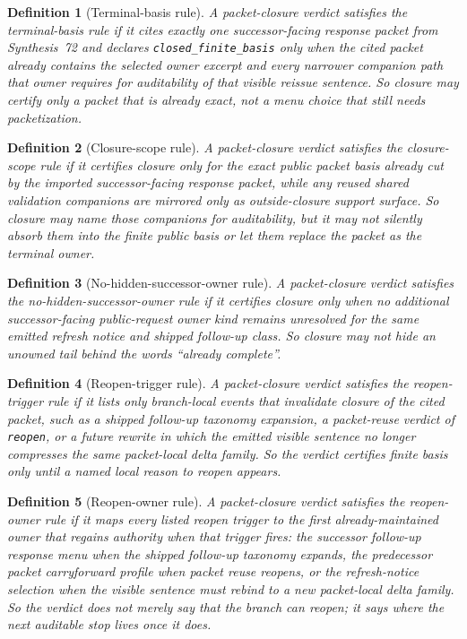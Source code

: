 \documentclass[11pt]{article}
\newtheorem{definition}{Definition}
\begin{document}
\begin{definition}[Terminal-basis rule]
A packet-closure verdict satisfies the \emph{terminal-basis rule} if it cites exactly one successor-facing response packet from Synthesis~72 and declares \texttt{closed\_finite\_basis} only when the cited packet already contains the selected owner excerpt and every narrower companion path that owner requires for auditability of that visible reissue sentence.
So closure may certify only a packet that is already exact, not a menu choice that still needs packetization.
\end{definition}

\begin{definition}[Closure-scope rule]
A packet-closure verdict satisfies the \emph{closure-scope rule} if it certifies closure only for the exact public packet basis already cut by the imported successor-facing response packet, while any reused shared validation companions are mirrored only as outside-closure support surface. So closure may name those companions for auditability, but it may not silently absorb them into the finite public basis or let them replace the packet as the terminal owner.
\end{definition}

\begin{definition}[No-hidden-successor-owner rule]
A packet-closure verdict satisfies the \emph{no-hidden-successor-owner rule} if it certifies closure only when no additional successor-facing public-request owner kind remains unresolved for the same emitted refresh notice and shipped follow-up class.
So closure may not hide an unowned tail behind the words ``already complete''.
\end{definition}

\begin{definition}[Reopen-trigger rule]
A packet-closure verdict satisfies the \emph{reopen-trigger rule} if it lists only branch-local events that invalidate closure of the cited packet, such as a shipped follow-up taxonomy expansion, a packet-reuse verdict of \texttt{reopen}, or a future rewrite in which the emitted visible sentence no longer compresses the same packet-local delta family.
So the verdict certifies finite basis only until a named local reason to reopen appears.
\end{definition}

\begin{definition}[Reopen-owner rule]
A packet-closure verdict satisfies the \emph{reopen-owner rule} if it maps every listed reopen trigger to the first already-maintained owner that regains authority when that trigger fires: the successor follow-up response menu when the shipped follow-up taxonomy expands, the predecessor packet carryforward profile when packet reuse reopens, or the refresh-notice selection when the visible sentence must rebind to a new packet-local delta family.
So the verdict does not merely say that the branch can reopen; it says where the next auditable stop lives once it does.
\end{definition}
\end{document}
